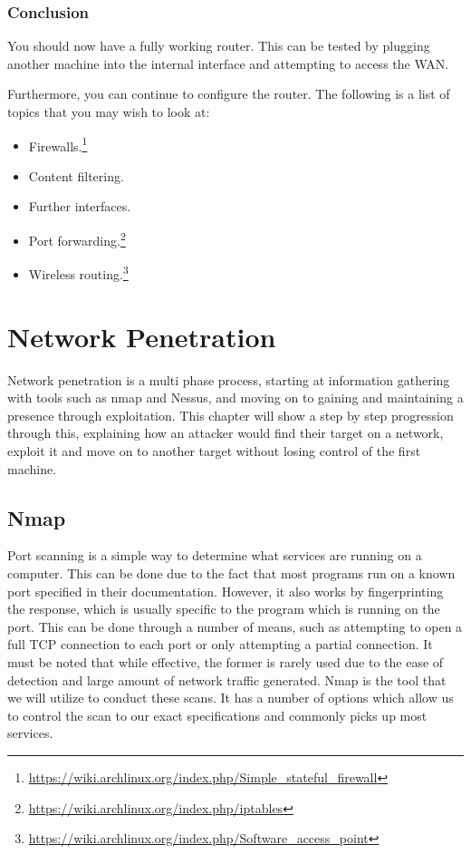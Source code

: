 \documentclass[a4paper,11pt]{report}
\begin{document}
			\subsection{Conclusion} 
				You should now have a fully working router. 
				This can be tested by plugging another machine into the internal interface and attempting to access the WAN. 

				Furthermore, you can continue to configure the router. 
				The following is a list of topics that you may wish to look at:
				\begin{itemize}
					\item Firewalls.\footnote{\url{https://wiki.archlinux.org/index.php/Simple\_stateful\_firewall}}
					\item Content filtering. 
					\item Further interfaces. 
					\item Port forwarding.\footnote{\url{https://wiki.archlinux.org/index.php/iptables}}
					\item Wireless routing.\footnote{\url{https://wiki.archlinux.org/index.php/Software\_access\_point}}
				\end{itemize}
				
\chapter{Network Penetration}
	\label{ch:NetworkPenetration}
	Network penetration is a multi phase process, starting at information gathering with tools such as nmap and Nessus, and moving on to gaining and maintaining a presence through exploitation. 
	This chapter will show a step by step progression through this, explaining how an attacker would find their target on a network, exploit it and move on to another target without losing control of the first machine. 
	\section{Nmap}
		Port scanning is a simple way to determine what services are running on a computer. 
		This can be done due to the fact that most programs run on a known port specified in their documentation. 
		However, it also works by fingerprinting the response, which is usually specific to the program which is running on the port. 
		This can be done through a number of means, such as attempting to open a full TCP connection to each port or only attempting a partial connection. 
		It must be noted that while effective, the former is rarely used due to the ease of detection and large amount of network traffic generated. 
		Nmap\cite{NmapBook} is the tool that we will utilize to conduct these scans. 
		It has a number of options which allow us to control the scan to our exact specifications and commonly picks up most services.\cite{HackingAOE} 
\end{document}
